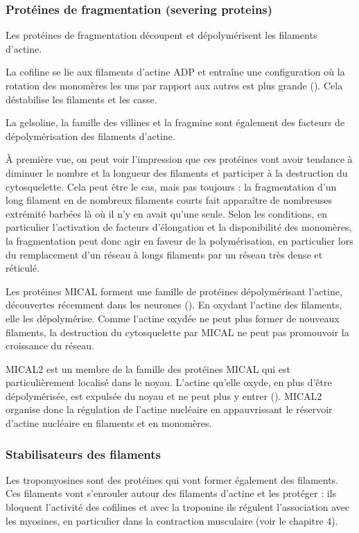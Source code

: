 \subsubsection{Protéines de fragmentation (severing proteins)}
Les protéines de fragmentation découpent et dépolymérisent les filaments d'actine. 

La cofiline se lie aux filaments d'actine ADP et entraîne une configuration où la rotation des monomères les uns par rapport aux autres est plus grande (\cite{mcgough_cofilin_1997}). Cela déstabilise les filaments et les casse. 

La gelsoline, la famille des villines et la fragmine sont également des facteurs de dépolymérisation des filaments d'actine. 

À première vue, on peut voir l'impression que ces protéines vont avoir tendance à diminuer le nombre et la longueur des filaments et participer à la destruction du cytosquelette. Cela peut être le cas, mais pas toujours : la fragmentation d'un long filament en de nombreux filaments courts fait apparaître de nombreuses extrémité barbées là où il n'y en avait qu'une seule. Selon les conditions, en particulier l'activation de facteurs d'élongation et la disponibilité des monomères, la fragmentation peut donc agir en faveur de la polymérisation, en particulier lors du remplacement d'un réseau à longs filaments par un réseau très dense et réticulé. 

Les protéines MICAL forment une famille de protéines dépolymérisant l'actine, découvertes récemment dans les neurones (\cite{hung_direct_2011}). En oxydant l'actine des filaments, elle les dépolymérise. Comme l'actine oxydée ne peut plus former de nouveaux filaments, la destruction du cytosquelette par MICAL ne peut pas promouvoir la croissance du réseau. 

MICAL2 est un membre de la famille des protéines MICAL qui est particulièrement localisé dans le noyau. L'actine qu'elle oxyde, en plus d'être dépolymérisée, est expulsée du noyau et ne peut plus y entrer (\cite{lundquist_redox_2014}). MICAL2 organise donc la régulation de l'actine nucléaire en appauvrissant le réservoir d'actine nucléaire en filaments et en monomères.

\subsubsection{Stabilisateurs des filaments}

Les tropomyosines sont des protéines qui vont former également des filaments. Ces filaments vont s'enrouler autour des filaments d'actine et les protéger : ils bloquent l'activité des cofilines et avec la troponine ils régulent l'association avec les myosines, en particulier dans la contraction musculaire (voir le chapitre 4).


